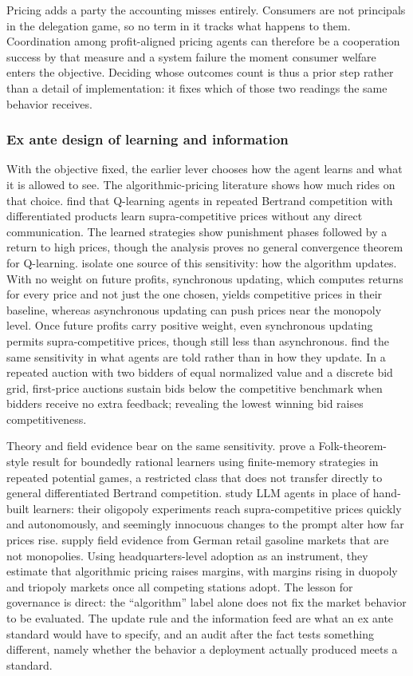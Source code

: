 Pricing adds a party the accounting misses entirely. Consumers are not principals in
the delegation game, so no term in it tracks what happens to them. Coordination among
profit-aligned pricing agents can therefore be a cooperation success by that measure
and a system failure the moment consumer welfare enters the objective. Deciding whose
outcomes count is thus a prior step rather than a detail of implementation: it fixes
which of those two readings the same behavior receives.

\subsubsection{Ex ante design of learning and information}
With the objective fixed, the earlier lever chooses how the agent learns and what it
is allowed to see. The algorithmic-pricing literature shows how much rides on that
choice. \citet{Calvano2020} find that Q-learning agents in repeated Bertrand
competition with differentiated products learn supra-competitive prices without any
direct communication. The learned strategies show punishment phases followed by a return to high prices, though the analysis proves no general
convergence theorem for Q-learning. \citet{Asker2022} isolate one source of this sensitivity: how the
algorithm updates. With no weight on future profits, synchronous updating, which computes returns for every price and not just the
one chosen, yields competitive prices in their baseline, whereas asynchronous updating can push prices near the
monopoly level. Once future profits carry positive weight, even synchronous updating
permits supra-competitive prices, though still less than asynchronous.
\citet{BanchioSkrzypacz2022} find the same sensitivity in what agents are told rather
than in how they update. In a repeated auction with two bidders of equal normalized
value and a discrete bid grid, first-price auctions sustain bids below the competitive
benchmark when bidders receive no extra feedback; revealing the lowest winning bid
raises competitiveness.

Theory and field evidence bear on the same sensitivity. \citet{Cartea2025} prove a
Folk-theorem-style result for boundedly rational learners using finite-memory
strategies in repeated potential games, a restricted class that does not transfer
directly to general differentiated Bertrand competition.
\citet{FishGonczarowskiShorrer2024} study LLM agents in place of hand-built learners:
their oligopoly experiments reach supra-competitive prices quickly and autonomously,
and seemingly innocuous changes to the prompt alter how far prices rise.
\citet{Assad2024} supply field evidence from German retail gasoline markets that are
not monopolies. Using headquarters-level adoption as an instrument, they estimate that
algorithmic pricing raises margins, with margins rising in duopoly and triopoly
markets once all competing stations adopt. The lesson for governance is direct: the
``algorithm'' label alone does not fix the market behavior to be evaluated. The update
rule and the information feed are what an ex ante standard would have to specify, and
an audit after the fact tests something different, namely whether the behavior
a deployment actually produced meets a standard.

